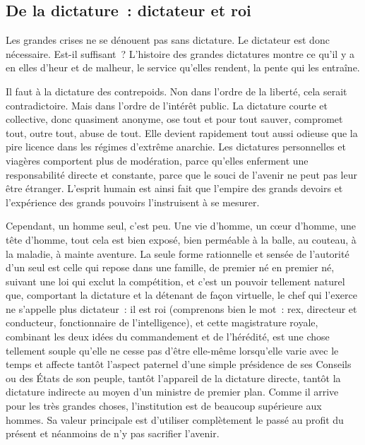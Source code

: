 \documentclass[french,twoside]{book} %
\begin{document}
\subsection[{De la dictature : dictateur et roi}]{De la dictature : dictateur et roi}
\noindent Les grandes crises ne se dénouent pas sans dictature. Le dictateur est donc nécessaire. Est-il suffisant ? L’histoire des grandes dictatures montre ce qu’il y a en elles d’heur et de malheur, le service qu’elles rendent, la pente qui les entraîne.\par
Il faut à la dictature des contrepoids. Non dans l’ordre de la liberté, cela serait contradictoire. Mais dans l’ordre de l’intérêt public. La dictature courte et collective, donc quasiment anonyme, ose tout et pour tout sauver, compromet tout, outre tout, abuse de tout. Elle devient rapidement tout aussi odieuse que la pire licence dans les régimes d’extrême anarchie. Les dictatures personnelles et viagères comportent plus de modération, parce qu’elles enferment une responsabilité directe et constante, parce que le souci de l’avenir ne peut pas leur être étranger. L’esprit humain est ainsi fait que l’empire des grands devoirs et l’expérience des grands pouvoirs l’instruisent à se mesurer.\par
Cependant, un homme seul, c’est peu. Une vie d’homme, un cœur d’homme, une tête d’homme, tout cela est bien exposé, bien perméable à la balle, au couteau, à la maladie, à mainte aventure. La seule forme rationnelle et sensée de l’autorité d’un seul est celle qui repose dans une famille, de premier né en premier né, suivant une loi qui exclut la compétition, et c’est un pouvoir tellement naturel que, comportant la dictature et la détenant de façon virtuelle, le chef qui l’exerce ne s’appelle plus dictateur : il est roi (comprenons bien le mot : rex, directeur et conducteur, fonctionnaire de l’intelligence), et cette magistrature royale, combinant les deux idées du commandement et de l’hérédité, est une chose tellement souple qu’elle ne cesse pas d’être elle-même lorsqu’elle varie avec le temps et affecte tantôt l’aspect paternel d’une simple présidence de ses Conseils ou des États de son peuple, tantôt l’appareil de la dictature directe, tantôt la dictature indirecte au moyen d’un ministre de premier plan. Comme il arrive pour les très grandes choses, l’institution est de beaucoup supérieure aux hommes. Sa valeur principale est d’utiliser complètement le passé au profit du présent et néanmoins de n’y pas sacrifier l’avenir.\par
\end{document}
